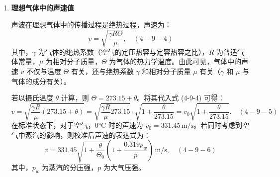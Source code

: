 \documentclass[12pt,a4paper]{article}
\begin{document}
\begin{enumerate}
\begin{itemize}
根据波的干涉理论，接收器两相邻声压极大值之间的距离为 $\frac{\lambda}{2}$。因此，若保持频率 $f$ 不变，通过测量两相邻信号幅值最大时 $S_1$ 与 $S_2$ 之间的距离差，则可以得到声波的半波长 $\frac{\lambda}{2}$，由 $v=\lambda f$ 即可求出声速 $v$。

\item \textbf{（2）相位法测声速}

如果用示波器测李萨如图形的方法观察超声波的发射波形与接收波形，则屏幕上一般会显示一个倾斜的椭圆，这是由于发射波在空间传播一段距离后，会有相位变化，椭圆倾斜情况反映发射与接收信号之间的相位差。缓慢改变接收器的位置，接收信号的相位会随之缓慢变化，导致椭圆倾斜角度随之变化，如图 4-9-3 所示。当椭圆变成通过第一、三象限的一条直线段时，发射信号与接收信号同相，相位差为 0；继续移动接收器，当椭圆变成通过第二、四象限的一条直线段时，发射信号与接收信号反相，相位差为 $\pi$。相位差从 0 到 $\pi$，接收器移动的距离应为半个波长，因此可以精确测定超声波在空气中传播时的波长，由 $v=\lambda f$ 即可求出声速 $v$。

\item \textbf{（3）时差法测声速}

将施加在发射器 $S_1$ 上的连续正弦电信号换成一脉冲电信号，超声发射器 $S_1$ 产生一在介质中传播的超声脉冲，经过时间 $t$ 后，到达距离 $L$ 处的接收器 $S_2$，测读超声波的传输时间 $t$ 及距离 $L$，由 $v=\frac{L}{t}$ 可求出声速 $v$。实际测量时，通常采用测量距离变化 $\Delta L$ 和时间变化 $\Delta t$ 的方法求出声速 $v=\frac{\Delta L}{\Delta t}$。
\end{itemize}

\item \textbf{理想气体中的声速值}

声波在理想气体中的传播过程是绝热过程，声速为：
\begin{equation}
v=\sqrt{\frac{\gamma R\Theta}{\mu}}, \quad (4-9-4)
\end{equation}
其中，$\gamma$ 为气体的绝热系数（空气的定压热容与定容热容之比），$R$ 为普适气体常量，$\mu$ 为相对分子质量，$\Theta$ 为气体的热力学温度。由此可见，气体中的声速 $v$ 不仅与温度 $\Theta$ 有关，还与绝热系数 $\gamma$ 和相对分子质量 $\mu$ 有关（$\gamma$ 和 $\mu$ 与气体的成分有关）。

若以摄氏温度 $\theta$ 计算，则 $\Theta=273.15+\theta$。将其代入式 (4-9-4) 可得：
\begin{equation}
v=\sqrt{\frac{\gamma R}{\mu}(273.15+\theta)}=\sqrt{\frac{\gamma R}{\mu}273.15}\cdot\sqrt{1+\frac{\theta}{273.15}}=v_0\sqrt{1+\frac{\theta}{273.15}}. \quad (4-9-5)
\end{equation}
在标准状态下，对于空气，0°C 时的声速为 $v_0=331.45\,\text{m/s}$。若同时考虑到空气中蒸汽的影响，则校准后声速的表达式为：
\begin{equation}
v=331.45\sqrt{1+\frac{\theta}{\Theta_0}}\left(1+\frac{0.319p_w}{p}\right)\,\text{m/s}, \quad (4-9-6)
\end{equation}
其中，$p_w$ 为蒸汽的分压强，$p$ 为大气压强。
\end{enumerate}
\end{document}
